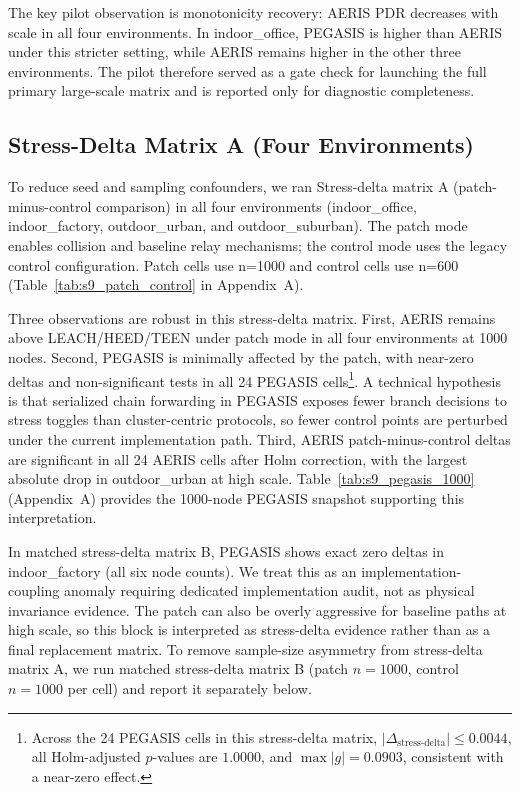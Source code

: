 ﻿\documentclass[sensors,article,submit,moreauthors,pdftex]{Definitions/mdpi}
\begin{document}
The key pilot observation is monotonicity recovery: AERIS PDR decreases with scale in all four environments. In indoor\_office, PEGASIS is higher than AERIS under this stricter setting, while AERIS remains higher in the other three environments. The pilot therefore served as a gate check for launching the full primary large-scale matrix and is reported only for diagnostic completeness.

\subsection{Stress-Delta Matrix A (Four Environments)}
To reduce seed and sampling confounders, we ran Stress-delta matrix A (patch-minus-control comparison) in all four environments (indoor\_office, indoor\_factory, outdoor\_urban, and outdoor\_suburban). The patch mode enables collision and baseline relay mechanisms; the control mode uses the legacy control configuration. Patch cells use n=1000 and control cells use n=600 (Table~\ref{tab:s9_patch_control} in Appendix~A).

Three observations are robust in this stress-delta matrix. First, AERIS remains above LEACH/HEED/TEEN under patch mode in all four environments at 1000 nodes. Second, PEGASIS is minimally affected by the patch, with near-zero deltas and non-significant tests in all 24 PEGASIS cells\footnote{Across the 24 PEGASIS cells in this stress-delta matrix, \(|\Delta_{\text{stress-delta}}| \le 0.0044\), all Holm-adjusted \(p\)-values are \(1.0000\), and \(\max |g| = 0.0903\), consistent with a near-zero effect.}. A technical hypothesis is that serialized chain forwarding in PEGASIS exposes fewer branch decisions to stress toggles than cluster-centric protocols, so fewer control points are perturbed under the current implementation path. Third, AERIS patch-minus-control deltas are significant in all 24 AERIS cells after Holm correction, with the largest absolute drop in outdoor\_urban at high scale. Table~\ref{tab:s9_pegasis_1000} (Appendix~A) provides the 1000-node PEGASIS snapshot supporting this interpretation.

In matched stress-delta matrix B, PEGASIS shows exact zero deltas in indoor\_factory (all six node counts). We treat this as an implementation-coupling anomaly requiring dedicated implementation audit, not as physical invariance evidence. The patch can also be overly aggressive for baseline paths at high scale, so this block is interpreted as stress-delta evidence rather than as a final replacement matrix. To remove sample-size asymmetry from stress-delta matrix A, we run matched stress-delta matrix B (patch \(n=1000\), control \(n=1000\) per cell) and report it separately below.
\end{document}
